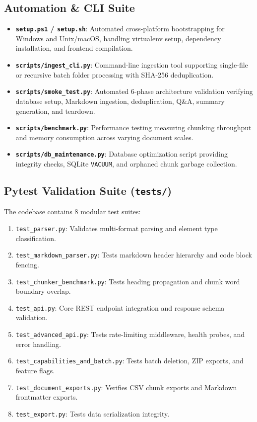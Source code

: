 \documentclass[11pt,a4paper]{article}
\begin{document}
\subsection{Automation \& CLI Suite}
\begin{itemize}[leftmargin=*]
    \item \textbf{\texttt{setup.ps1} / \texttt{setup.sh}}: Automated cross-platform bootstrapping for Windows and Unix/macOS, handling virtualenv setup, dependency installation, and frontend compilation.
    \item \textbf{\texttt{scripts/ingest\_cli.py}}: Command-line ingestion tool supporting single-file or recursive batch folder processing with SHA-256 deduplication.
    \item \textbf{\texttt{scripts/smoke\_test.py}}: Automated 6-phase architecture validation verifying database setup, Markdown ingestion, deduplication, Q\&A, summary generation, and teardown.
    \item \textbf{\texttt{scripts/benchmark.py}}: Performance testing measuring chunking throughput and memory consumption across varying document scales.
    \item \textbf{\texttt{scripts/db\_maintenance.py}}: Database optimization script providing integrity checks, SQLite \texttt{VACUUM}, and orphaned chunk garbage collection.
\end{itemize}

\subsection{Pytest Validation Suite (\texttt{tests/})}
The codebase contains 8 modular test suites:
\begin{enumerate}[leftmargin=*]
    \item \texttt{test\_parser.py}: Validates multi-format parsing and element type classification.
    \item \texttt{test\_markdown\_parser.py}: Tests markdown header hierarchy and code block fencing.
    \item \texttt{test\_chunker\_benchmark.py}: Tests heading propagation and chunk word boundary overlap.
    \item \texttt{test\_api.py}: Core REST endpoint integration and response schema validation.
    \item \texttt{test\_advanced\_api.py}: Tests rate-limiting middleware, health probes, and error handling.
    \item \texttt{test\_capabilities\_and\_batch.py}: Tests batch deletion, ZIP exports, and feature flags.
    \item \texttt{test\_document\_exports.py}: Verifies CSV chunk exports and Markdown frontmatter exports.
    \item \texttt{test\_export.py}: Tests data serialization integrity.
\end{enumerate}
\end{document}
